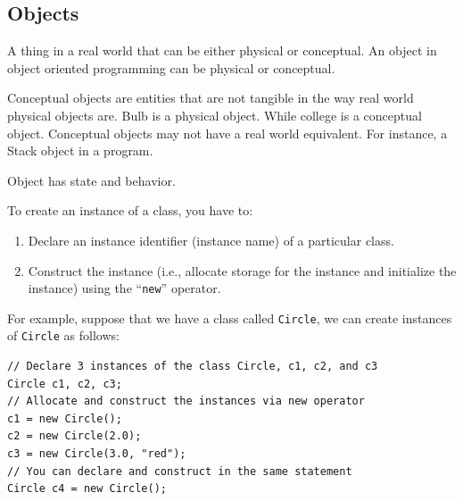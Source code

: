 \documentclass[11pt,a4paper]{article}
\begin{document}
\subsection*{Objects}
A thing in a real world that can be either physical or conceptual. An object in object oriented programming can be physical or conceptual.

Conceptual objects are entities that are not tangible in the way real world physical objects are. Bulb is a physical object. While college is a conceptual object. Conceptual objects may not have a real world equivalent. For instance, a Stack object in a program.

Object has state and behavior.

To create an instance of a class, you have to:
\begin{enumerate}
\item Declare an instance identifier (instance name) of a particular class.
\item Construct the instance (i.e., allocate storage for the instance and initialize the instance) using the ``\texttt{new}'' operator.
\end{enumerate}
For example, suppose that we have a class called \texttt{Circle}, we can create instances of \texttt{Circle} as follows:
\begin{lstlisting}[numbers=none, xleftmargin=.25in]
// Declare 3 instances of the class Circle, c1, c2, and c3
Circle c1, c2, c3;
// Allocate and construct the instances via new operator
c1 = new Circle();
c2 = new Circle(2.0);
c3 = new Circle(3.0, "red");
// You can declare and construct in the same statement
Circle c4 = new Circle();
\end{lstlisting} 
\vfill{\ }
\end{document}
